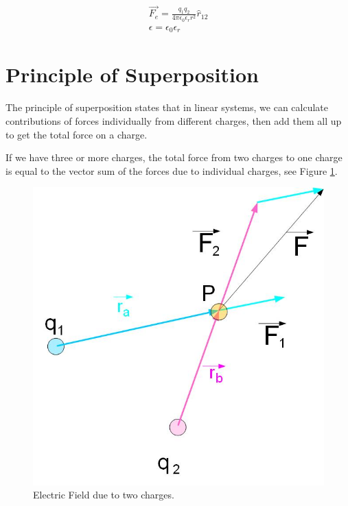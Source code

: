 \documentclass{ximera}
\begin{document}
\begin{eqnarray}
\vec{F_e}=\frac{q_1 q_2}{4 \pi \epsilon_0 \epsilon_r r^2} \hat{r}_{12} \label{EqCoulombslaw3} \\
\epsilon = \epsilon_0 \epsilon_r
\end{eqnarray}



\section{Principle of Superposition}

The principle of superposition states that in linear systems, we can calculate contributions of forces individually from different charges, then add them all up to get the total force on a charge.

If we have three or more charges, the total force from two charges to one charge is equal to the vector sum of the forces due to individual charges, see Figure \ref{UnitCh}. 



\begin{figure}[htbp]
\begin{center}
\includegraphics[scale=0.5]{../jpg/superpositionFORCE.jpg}
\end{center}
\caption{Electric Field due to two charges.}
\label{UnitCh}
\end{figure}
\end{document}
